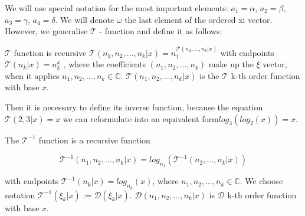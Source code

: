 We will use special notation for the most important 
elements: \(a_1 = \alpha\), \(a_2 = \beta\), 
\(a_3 = \gamma\), \(a_4 = \delta\). 
We will denote \(\omega\) the last element of 
the ordered xi vector. However, we generalise 
\(\mathcal{T}\) - function and define it as follows:

\begin{definition}
        \(\mathcal{T}\) function is recursive 
        \(\mathcal{T}(n_1, n_2, ..., n_k | x) = 
        n_1^{\mathcal{T}(n_2, ..., n_k | x)}\) 
        with endpoints \(\mathcal{T}(n_k | x ) = n_k^x\) , 
        where the coefficients  \((n_1, n_2, .
        .., n_k)\) make up the \(\xi\) vector,
        when it applies \(n_1, n_2, ..., n_k \in 
        \mathbb{C}\).  \(\mathcal{T}(n_1, n_2, ..
        ., n_k | x) \) is the \(\mathcal{T}\) k-th
        order function with base \(x\).
\end{definition}

Then it is necessary to define its inverse function,
because the equation \(\mathcal{T}(2, 3 | x) = x\) we
can reformulate into an equivalent form\(log_3(log_2(x)) = x\).

\begin{definition}
        The \(\mathcal{T}^{-1}\) function is a recursive function
        
        \begin{equation}
                \mathcal{T}^{-1}(n_1, n_2, ..., n_k | x) =
                log_{n_1}({\mathcal{T}^{-1}(n_2, ..., n_k | x)})
                \label{3}
        \end{equation}
        
        with endpoints \(\mathcal{T}^{-1}(n_k | x ) = log_{n_k}(x)\), 
        where \(n_1, n_2, ..., n_k \in  \mathbb{C}\). We choose notation
        \(\mathcal{T}^{-1}(\xi_k | x) := \mathcal{D}(\xi_k | x)\). 
        \(\mathcal{D}(n_1, n_2, ..., n_k | x) \) is \(\mathcal{D}\)
        k-th order function with base \(x\).
\end{definition}
